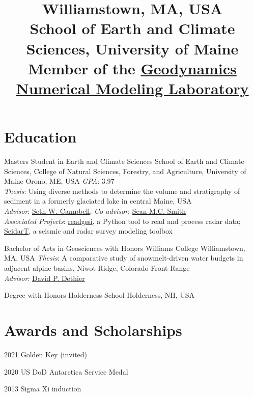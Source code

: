 \documentclass[a4paper,12pt,sans,colorlinks]{moderncv}
\title{%
    \small
    Williamstown, MA, USA
    \\
    School of Earth and Climate Sciences, University of Maine
    \\
    Member of the
    \href{http://wiki.geodynamics.umaine.edu/}{Geodynamics Numerical Modeling Laboratory}
}
\newcommand{\seth}{\href{https://www.alpinesciences.net}{Seth W. Campbell}}
\newcommand{\sean}{\href{https://umaine.edu/earthclimate/people/sean-m-c-smith/}{Sean M.C. Smith}}
\newcommand{\david}{\href{https://geosciences.williams.edu/profile/ddethier/}{David P. Dethier}}
\newcommand{\rsudp}{\href{https://github.com/iannesbitt/readgssi}{readgssi}}
\newcommand{\seidart}{\href{https://github.com/UMainedynamics/SeidarT}{SeidarT}}
\begin{document}

\maketitle
\vspace{-3em}


\section{Education}

{Masters Student in Earth and Climate Sciences}
{School of Earth and Climate Sciences,
College of Natural Sciences, Forestry, and Agriculture,
University of Maine}
{Orono, ME, USA}
{}
{
    \emph{GPA}: 3.97
    \\
    \emph{Thesis}: Using diverse methods to determine the volume and stratigraphy
    of sediment in a formerly glaciated lake in central Maine, USA
    \\
    \emph{Advisor}: \seth{}, \emph{Co-advisor}: \sean{}
    \\
    \emph{Associated Projects}: \rsudp{}, a Python tool to read and process radar data;
    \seidart{}, a seismic and radar survey modeling toolbox
}

{Bachelor of Arts in Geosciences with Honors}
{Williams College}
{Williamstown, MA, USA}
{}
{
    \emph{Thesis}: A comparative study of snowmelt-driven water budgets in
    adjacent alpine basins, Niwot Ridge, Colorado Front Range
    \\
    \emph{Advisor}: \david{}
}

{Degree with Honors}
{Holderness School}
{Holderness, NH, USA}
{}
{}


\section{Awards and Scholarships}

\cvline
{2021}
{Golden Key (invited)}

\cvline
{2020}
{US DoD Antarctica Service Medal}

\cvline
{2013}
{Sigma Xi induction}
\end{document}
